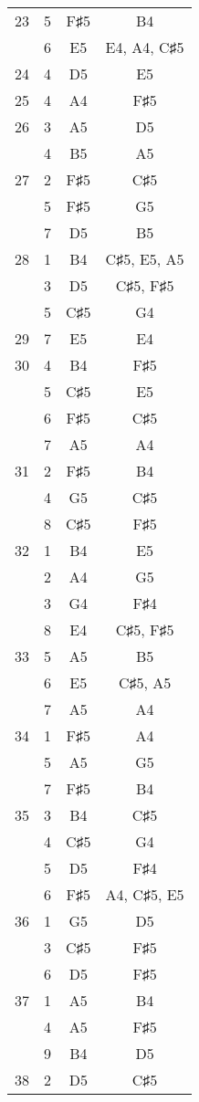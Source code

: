 \documentclass{article}
\begin{document}
\begin{longtable}{|c|c|c|c|}
\hline
23 & 5 & F♯5 & B4 \\ 
  & 6 & E5 & E4, A4, C♯5 \\ 
\hline
24 & 4 & D5 & E5 \\ 
\hline
25 & 4 & A4 & F♯5 \\ 
\hline
26 & 3 & A5 & D5 \\ 
  & 4 & B5 & A5 \\ 
\hline
27 & 2 & F♯5 & C♯5 \\ 
  & 5 & F♯5 & G5 \\ 
  & 7 & D5 & B5 \\ 
\hline
28 & 1 & B4 & C♯5, E5, A5 \\ 
  & 3 & D5 & C♯5, F♯5 \\ 
  & 5 & C♯5 & G4 \\ 
\hline
29 & 7 & E5 & E4 \\ 
\hline
30 & 4 & B4 & F♯5 \\ 
  & 5 & C♯5 & E5 \\ 
  & 6 & F♯5 & C♯5 \\ 
  & 7 & A5 & A4 \\ 
\hline
31 & 2 & F♯5 & B4 \\ 
  & 4 & G5 & C♯5 \\ 
  & 8 & C♯5 & F♯5 \\ 
\hline
32 & 1 & B4 & E5 \\ 
  & 2 & A4 & G5 \\ 
  & 3 & G4 & F♯4 \\ 
  & 8 & E4 & C♯5, F♯5 \\ 
\hline
33 & 5 & A5 & B5 \\ 
  & 6 & E5 & C♯5, A5 \\ 
  & 7 & A5 & A4 \\ 
\hline
34 & 1 & F♯5 & A4 \\ 
  & 5 & A5 & G5 \\ 
  & 7 & F♯5 & B4 \\ 
\hline
35 & 3 & B4 & C♯5 \\ 
  & 4 & C♯5 & G4 \\ 
  & 5 & D5 & F♯4 \\ 
  & 6 & F♯5 & A4, C♯5, E5 \\ 
\hline
36 & 1 & G5 & D5 \\ 
  & 3 & C♯5 & F♯5 \\ 
  & 6 & D5 & F♯5 \\ 
\hline
37 & 1 & A5 & B4 \\ 
  & 4 & A5 & F♯5 \\ 
  & 9 & B4 & D5 \\ 
\hline
38 & 2 & D5 & C♯5 \\ 

\end{longtable}
\end{document}
